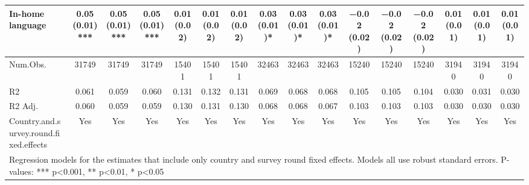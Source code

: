 \begin{table}[H]
\begin{tabular}[t]{lccccccccccccccc}
In-home language & \num{0.05} (\num{0.01})*** & \num{0.05} (\num{0.01})*** & \num{0.05} (\num{0.01})*** & \num{0.01} (\num{0.02}) & \num{0.01} (\num{0.02}) & \num{0.01} (\num{0.02}) & \num{0.03} (\num{0.01})* & \num{0.03} (\num{0.01})* & \num{0.03} (\num{0.01})* & \num{-0.02} (\num{0.02}) & \num{-0.02} (\num{0.02}) & \num{-0.02} (\num{0.02}) & \num{0.01} (\num{0.01}) & \num{0.01} (\num{0.01}) & \num{0.01} (\num{0.01})\\
\midrule
Num.Obs. & \num{31749} & \num{31749} & \num{31749} & \num{15401} & \num{15401} & \num{15401} & \num{32463} & \num{32463} & \num{32463} & \num{15240} & \num{15240} & \num{15240} & \num{31940} & \num{31940} & \num{31940}\\
R2 & \num{0.061} & \num{0.059} & \num{0.060} & \num{0.131} & \num{0.132} & \num{0.131} & \num{0.069} & \num{0.068} & \num{0.068} & \num{0.105} & \num{0.105} & \num{0.104} & \num{0.030} & \num{0.031} & \num{0.030}\\
R2 Adj. & \num{0.060} & \num{0.059} & \num{0.059} & \num{0.130} & \num{0.131} & \num{0.130} & \num{0.068} & \num{0.068} & \num{0.067} & \num{0.103} & \num{0.103} & \num{0.103} & \num{0.030} & \num{0.030} & \num{0.030}\\
Country.and.survey.round.fixed.effects & Yes & Yes & Yes & Yes & Yes & Yes & Yes & Yes & Yes & Yes & Yes & Yes & Yes & Yes & Yes\\
\bottomrule
\multicolumn{16}{l}{\rule{0pt}{1em}Regression models for the estimates that include only country and survey round fixed effects. Models all use robust standard errors. P-values: *** p<0.001, ** p<0.01, * p<0.05}\\
\end{tabular}
\end{table}
